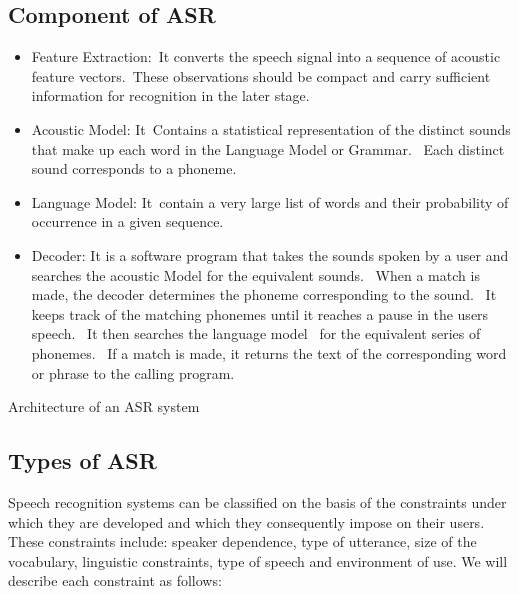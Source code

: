 \documentclass[letterpaper,10pt,english]{jupyterBook}
\begin{document}
\subsection{Component of ASR}
\label{\detokenize{Recognition/Speech_Recognition:component-of-asr}}\begin{itemize}
\item {} 
\sphinxAtStartPar
Feature Extraction: It converts the speech signal into a sequence of
acoustic feature vectors. These observations should be compact and
carry sufficient information for recognition in the later stage.

\item {} 
\sphinxAtStartPar
Acoustic Model: It Contains a statistical representation of the
distinct sounds that make up each word in the Language Model or
Grammar.  Each distinct sound corresponds to a phoneme.

\item {} 
\sphinxAtStartPar
Language Model: It contain a very large list of words and their
probability of occurrence in a given sequence.

\item {} 
\sphinxAtStartPar
Decoder: It is a software program that takes the sounds spoken by a
user and searches the acoustic Model for the equivalent sounds. 
When a match is made, the decoder determines the phoneme
corresponding to the sound.  It keeps track of the matching phonemes
until it reaches a pause in the users speech.  It then searches the
language model  for the equivalent series of phonemes.  If a match
is made, it returns the text of the corresponding word or phrase to
the calling program.

\end{itemize}

\sphinxAtStartPar
{}
Architecture of an ASR system


\subsection{Types of ASR}
\label{\detokenize{Recognition/Speech_Recognition:types-of-asr}}
\sphinxAtStartPar
Speech recognition systems can be classified on the basis of the
constraints under which they are developed and which they consequently
impose on their users. These constraints include: speaker dependence,
type of utterance, size of the vocabulary, linguistic constraints, type
of speech and environment of use. We will describe each constraint as
follows:
\end{document}
